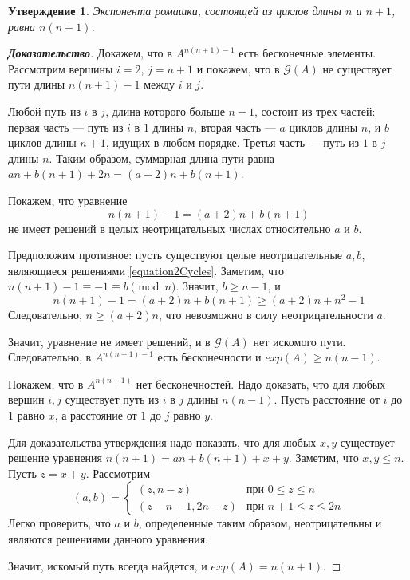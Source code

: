 \documentclass[12pt]{article}
\newtheorem{proposition}[theorem]{Утверждение}
\begin{document}
\begin{proposition}
Экспонента ромашки, состоящей из циклов длины $n$ и $n + 1$, равна $n(n+1)$.
\end{proposition}
\begin{proof}[\textbf{Доказательство}]
Докажем, что в $A^{n(n + 1) - 1}$ есть бесконечные элементы. Рассмотрим вершины $i = 2$, $j = n + 1$ и покажем, что в $\mathcal{G}(A)$ не существует пути длины $n(n + 1) - 1$ между $i$ и $j$.

Любой путь из $i$ в $j$, длина которого больше $n - 1$, состоит из трех частей: первая часть --- путь из $i$ в $1$ длины $n$, вторая часть --- $a$ циклов длины $n$, и $b$ циклов длины $n + 1$, идущих в любом порядке. Третья часть --- путь из $1$ в $j$ длины $n$. Таким образом, суммарная длина пути равна $an + b(n + 1) + 2n = (a+2)n + b(n + 1)$.

Покажем, что уравнение \begin{equation}
\label{equation2Cycles}
n(n+1)-1 = (a+2)n + b(n + 1)
\end{equation}
не имеет решений в целых неотрицательных числах относительно $a$ и $b$.

Предположим противное: пусть существуют целые неотрицательные $a, b$, являющиеся решениями \ref{equation2Cycles}. Заметим, что $n(n+1)-1 \equiv -1 \equiv b \pmod{n}$. Значит, $b \ge n - 1$, и\begin{equation*}
n(n+1)-1 = (a+2)n + b(n + 1) \ge (a+2)n + n^2 - 1
\end{equation*}
Следовательно, $n \ge (a + 2)n$, что невозможно в силу неотрицательности $a$.

Значит, уравнение не имеет решений, и в $\mathcal{G}(A)$ нет искомого пути. Следовательно, в $A^{n(n + 1) - 1}$ есть бесконечности и $exp(A) \ge n(n-1)$.

Покажем, что в $A^{n(n + 1)}$ нет бесконечностей. Надо доказать, что для любых вершин $i, j$ существует путь из $i$ в $j$ длины $n(n - 1)$. Пусть расстояние от $i$ до $1$ равно $x$, а расстояние от $1$ до $j$ равно $y$.

Для доказательства утверждения надо показать, что для любых $x, y$ существует решение уравнения $n(n+1) = an + b(n + 1) + x + y$. Заметим, что $x, y \le n$. Пусть $z = x + y$. Рассмотрим \begin{equation*}
(a, b) = \begin{cases}
(z, n - z) & \text{при $0 \le z \le n$} \\
(z - n - 1, 2n - z) & \text{при $n+1 \le z \le 2n$}
\end{cases}
\end{equation*}
Легко проверить, что $a$ и $b$, определенные таким образом, неотрицательны и являются решениями данного уравнения.

Значит, искомый путь всегда найдется, и $exp(A) = n(n + 1)$.
\end{proof}
\end{document}
